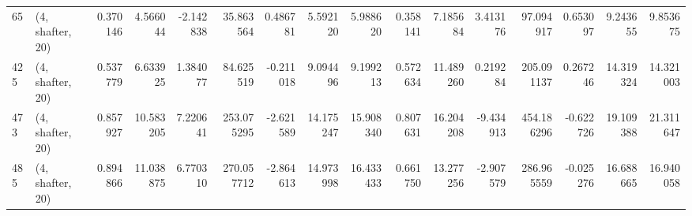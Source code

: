 \begin{tabular}{llrrrrrrrrrrrrrr}
65  &  (4, shafter, 20) &   0.370146 &   4.566044 &  -2.142838 &    35.863564 &   0.486781 &   5.592120 &   5.988620 &  0.358141 &   7.185684 &   3.413176 &     97.094917 &    0.653097 &    9.243655 &    9.853675 \\
425 &  (4, shafter, 20) &   0.537779 &   6.633925 &   1.384077 &    84.625519 &  -0.211018 &   9.094496 &   9.199213 &  0.572634 &  11.489260 &   0.219284 &    205.091137 &    0.267246 &   14.319324 &   14.321003 \\
473 &  (4, shafter, 20) &   0.857927 &  10.583205 &   7.220641 &   253.075295 &  -2.621589 &  14.175247 &  15.908340 &  0.807631 &  16.204208 &  -9.434913 &    454.186296 &   -0.622726 &   19.109388 &   21.311647 \\
485 &  (4, shafter, 20) &   0.894866 &  11.038875 &   6.770310 &   270.057712 &  -2.864613 &  14.973998 &  16.433433 &  0.661750 &  13.277256 &  -2.907579 &    286.965559 &   -0.025276 &   16.688665 &   16.940058 \\
\bottomrule
\end{tabular}
